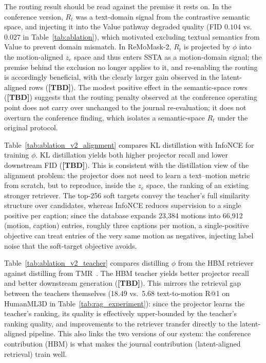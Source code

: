 The routing result should be read against the premise it rests on. In the conference version, $R_t$ was a text-domain signal from the contrastive semantic space, and injecting it into the Value pathway degraded quality (FID $0.104$ vs.\ $0.027$ in Table~\ref{tab:ablation}), which motivated excluding textual semantics from Value to prevent domain mismatch. In ReMoMask-2, $R_t$ is projected by $\phi$ into the motion-aligned $z_e$ space and thus enters SSTA as a motion-domain signal; the premise behind the exclusion no longer applies to it, and re-enabling the routing is accordingly beneficial, with the clearly larger gain observed in the latent-aligned rows (\textbf{[TBD]}). The modest positive effect in the semantic-space rows (\textbf{[TBD]}) suggests that the routing penalty observed at the conference operating point does not carry over unchanged to the journal re-evaluation; it does not overturn the conference finding, which isolates a semantic-space $R_t$ under the original protocol.

\noindent {}
Table~\ref{tab:ablation_v2_alignment} compares KL distillation with InfoNCE for training $\phi$. KL distillation yields both higher projector recall and lower downstream FID (\textbf{[TBD]}). This is consistent with the distillation view of the alignment problem: the projector does not need to learn a text--motion metric from scratch, but to reproduce, inside the $z_e$ space, the ranking of an existing stronger retriever. The top-256 soft targets convey the teacher's full similarity structure over candidates, whereas InfoNCE reduces supervision to a single positive per caption; since the database expands 23,384 motions into 66,912 (motion, caption) entries, roughly three captions per motion, a single-positive objective can treat entries of the very same motion as negatives, injecting label noise that the soft-target objective avoids.

\noindent {}
Table~\ref{tab:ablation_v2_teacher} compares distilling $\phi$ from the HBM retriever against distilling from TMR~\cite{tmr}. The HBM teacher yields better projector recall and better downstream generation (\textbf{[TBD]}). This mirrors the retrieval gap between the teachers themselves (18.49 vs.\ 5.68 text-to-motion R@1 on HumanML3D in Table~\ref{tab:rag_experiment}): since the projector learns the teacher's ranking, its quality is effectively upper-bounded by the teacher's ranking quality, and improvements to the retriever transfer directly to the latent-aligned pipeline. This also links the two versions of our system: the conference contribution (HBM) is what makes the journal contribution (latent-aligned retrieval) train well.

